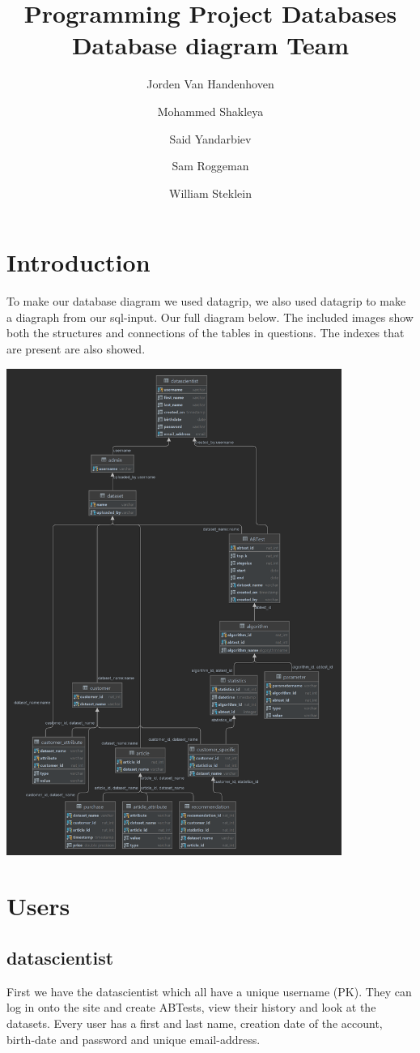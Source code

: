 \documentclass[a4paper,12pt]{article}
\title{\textbf{Programming Project Databases \\ Database diagram Team \teamnr}}
\author{Jorden Van Handenhoven\and Mohammed Shakleya\and Said Yandarbiev\and Sam Roggeman\and William Steklein}
\begin{document}
		
	\maketitle
	\tableofcontents
	\pagebreak
	\section{Introduction}
	To make our database diagram we used datagrip, we also used datagrip to make a diagraph from our sql-input. Our full diagram below. The included images show both the structures and connections of the tables in questions. The indexes that are present are also showed.\\ 
	\begin{center}
  		\includegraphics[height=600px]{FullDiagraph.png}
\end{center}
\restoregeometry     
	\pagebreak
	\section{Users}
	\subsection{datascientist}
	First we have the datascientist which all have a unique username (PK). They can log in onto the site and create ABTests, view their history and look at the datasets. Every user has a first and last name, creation date of the account, birth-date and password and unique email-address. 
\end{document}
